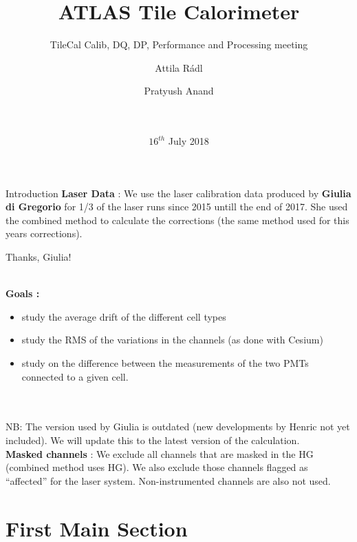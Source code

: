 \documentclass{beamer}
\title{ATLAS Tile Calorimeter}
\subtitle{TileCal Calib, DQ, DP, Performance and Processing meeting}
\author{Attila R\'adl\inst{1} \and Pratyush Anand\inst{2}

 }
\institute[] %
{
  \inst{1}%
  Institute of Physics\\
  E\"otv\"os Lor\'and University
  
  \and
  \inst{2}%
  Department of Physics\\
  Indian Institute of Technology Madras
  
  \and
  \inst{3}%
  ATLAS TileCal Group\\
  CERN}
\date{\\\\$16^{th}$ July 2018}
\begin{document}
\begin{frame}
  \titlepage
\end{frame}

    
\begin{frame}{Introduction}
\textbf{Laser Data} : We use	the	laser calibration data produced by \textbf{Giulia di Gregorio} for 1/3 of the laser runs	since 2015 untill the end of 2017. She used the combined method to calculate the corrections (the	same method	used for this years corrections).\\	
\begin{center} \color{red}Thanks, Giulia! \end{center}\\
\textbf{Goals :}
\begin{itemize}
    \item study the average drift of the different cell types
    \item study the RMS of the variations in the channels (as done with Cesium)
    \item study on the difference between the measurements of the two PMTs connected to a given cell. 
\end{itemize}	\\\\	
NB:	The version used by Giulia is outdated (new developments by Henric not yet included). We will update this to the latest version of the calculation.\\
\textbf{Masked channels} : We exclude all channels that	are	masked in the HG (combined method uses HG).	
We also	exclude	those channels flagged as “affected” for the laser system. Non-instrumented	channels are also not used.	
\end{frame}

\section{First Main Section}
\end{document}
